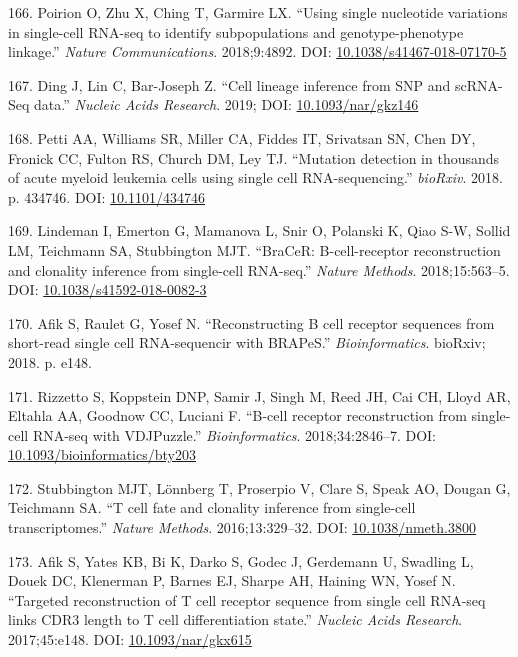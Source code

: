 \documentclass[11pt,a4paper,titlepage,twoside,openright]{style/unimelbthesis}
\theoremstyle{definition}
\theoremstyle{definition}
\theoremstyle{definition}
\theoremstyle{remark}
\begin{document}
\begin{mainmatter}
\leavevmode\hypertarget{ref-Poirion2018-mc}{}%
166. Poirion O, Zhu X, Ching T, Garmire LX. ``Using single nucleotide variations in single-cell RNA-seq to identify subpopulations and genotype-phenotype linkage.'' \emph{Nature Communications}. 2018;9:4892. DOI: \href{https://doi.org/10.1038/s41467-018-07170-5}{10.1038/s41467-018-07170-5}

\leavevmode\hypertarget{ref-Ding2019-kx}{}%
167. Ding J, Lin C, Bar-Joseph Z. ``Cell lineage inference from SNP and scRNA-Seq data.'' \emph{Nucleic Acids Research}. 2019; DOI: \href{https://doi.org/10.1093/nar/gkz146}{10.1093/nar/gkz146}

\leavevmode\hypertarget{ref-Petti2018-bj}{}%
168. Petti AA, Williams SR, Miller CA, Fiddes IT, Srivatsan SN, Chen DY, Fronick CC, Fulton RS, Church DM, Ley TJ. ``Mutation detection in thousands of acute myeloid leukemia cells using single cell RNA-sequencing.'' \emph{bioRxiv}. 2018. p. 434746. DOI: \href{https://doi.org/10.1101/434746}{10.1101/434746}

\leavevmode\hypertarget{ref-Lindeman2018-bk}{}%
169. Lindeman I, Emerton G, Mamanova L, Snir O, Polanski K, Qiao S-W, Sollid LM, Teichmann SA, Stubbington MJT. ``BraCeR: B-cell-receptor reconstruction and clonality inference from single-cell RNA-seq.'' \emph{Nature Methods}. 2018;15:563--5. DOI: \href{https://doi.org/10.1038/s41592-018-0082-3}{10.1038/s41592-018-0082-3}

\leavevmode\hypertarget{ref-Afik2018-zl}{}%
170. Afik S, Raulet G, Yosef N. ``Reconstructing B cell receptor sequences from short-read single cell RNA-sequencir with BRAPeS.'' \emph{Bioinformatics}. bioRxiv; 2018. p. e148.

\leavevmode\hypertarget{ref-Rizzetto2018-ev}{}%
171. Rizzetto S, Koppstein DNP, Samir J, Singh M, Reed JH, Cai CH, Lloyd AR, Eltahla AA, Goodnow CC, Luciani F. ``B-cell receptor reconstruction from single-cell RNA-seq with VDJPuzzle.'' \emph{Bioinformatics}. 2018;34:2846--7. DOI: \href{https://doi.org/10.1093/bioinformatics/bty203}{10.1093/bioinformatics/bty203}

\leavevmode\hypertarget{ref-Stubbington2016-xw}{}%
172. Stubbington MJT, Lönnberg T, Proserpio V, Clare S, Speak AO, Dougan G, Teichmann SA. ``T cell fate and clonality inference from single-cell transcriptomes.'' \emph{Nature Methods}. 2016;13:329--32. DOI: \href{https://doi.org/10.1038/nmeth.3800}{10.1038/nmeth.3800}

\leavevmode\hypertarget{ref-Afik2017-qw}{}%
173. Afik S, Yates KB, Bi K, Darko S, Godec J, Gerdemann U, Swadling L, Douek DC, Klenerman P, Barnes EJ, Sharpe AH, Haining WN, Yosef N. ``Targeted reconstruction of T cell receptor sequence from single cell RNA-seq links CDR3 length to T cell differentiation state.'' \emph{Nucleic Acids Research}. 2017;45:e148. DOI: \href{https://doi.org/10.1093/nar/gkx615}{10.1093/nar/gkx615}


\end{mainmatter}
\end{document}
